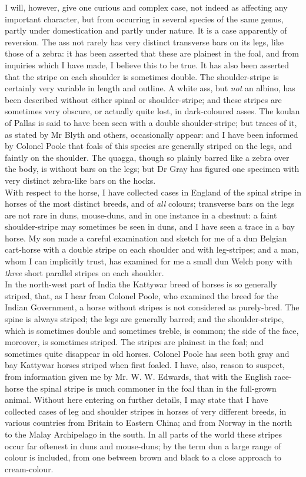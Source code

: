 \indent I will, however, give one curious and complex case, not indeed as affecting any important character, but from occurring in several species of the same genus, partly under domestication and partly under nature. It is a case apparently of reversion. The ass not rarely has very distinct transverse bars on its legs, like those of a zebra: it has been asserted that these are plainest in the foal, and from inquiries which I have made, I believe this to be true. It has also been asserted that the stripe on each shoulder is sometimes double. The shoulder-stripe is certainly very variable in length and outline. A white ass, but \emph{not} an albino, has been described without either spinal or shoulder-stripe; and these stripes are sometimes very obscure, or actually quite lost, in dark-coloured asses. The koulan of Pallas is said to have been seen with a double shoulder-stripe; but traces of it, as stated by Mr Blyth and others, occasionally appear: and I have been informed by Colonel Poole that foals of this species are generally striped on the legs, and faintly on the shoulder. The quagga, though so plainly barred like a zebra over the body, is without bars on the legs; but Dr Gray has figured one specimen with very distinct zebra-like bars on the hocks.\\
\indent With respect to the horse, I have collected cases in England of the spinal stripe in horses of the most distinct breeds, and of \emph{ all} colours; transverse bars on the legs are not rare in duns, mouse-duns, and in one instance in a chestnut: a faint shoulder-stripe may sometimes be seen in duns, and I have seen a trace in a bay horse. My son made a careful examination and sketch for me of a dun Belgian cart-horse with a double stripe on each shoulder and with leg-stripes; and a man, whom I can implicitly trust, has examined for me a small dun Welch pony with \emph{three} short parallel stripes on each shoulder.\\
\indent In the north-west part of India the Kattywar breed of horses is so generally striped, that, as I hear from Colonel Poole, who examined the breed for the Indian Government, a horse without stripes is not considered as purely-bred. The spine is always striped; the legs are generally barred; and the shoulder-stripe, which is sometimes double and sometimes treble, is common; the side of the face, moreover, is sometimes striped. The stripes are plainest in the foal; and sometimes quite disappear in old horses. Colonel Poole has seen both gray and bay Kattywar horses striped when first foaled. I have, also, reason to suspect, from information given me by Mr. W. W. Edwards, that with the English race-horse the spinal stripe is much commoner in the foal than in the full-grown animal. Without here entering on further details, I may state that I have collected cases of leg and shoulder stripes in horses of very different breeds, in various countries from Britain to Eastern China; and from Norway in the north to the Malay Archipelago in the south. In all parts of the world these stripes occur far oftenest in duns and mouse-duns; by the term dun a large range of colour is included, from one between brown and black to a close approach to cream-colour.\\
